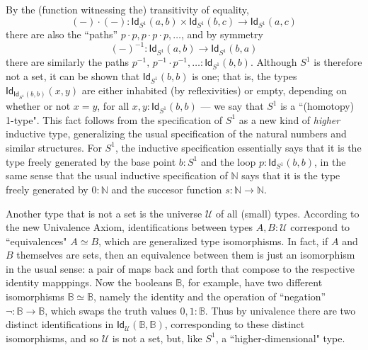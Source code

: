 \documentclass[11pt]{article}
\newcommand{\B}{\ensuremath{\mathbb{B}}}
\newcommand{\N}{\ensuremath{\mathbb{N}}}
\newcommand{\Id}{\mathsf{Id}}
\newcommand{\id}[1]{\Id_{#1}}
\newcommand{\U}{\ensuremath{\mathcal{U}}}
\theoremstyle{remark}
\theoremstyle{definition}
\begin{document}
%
%
By the (function witnessing the) transitivity of equality, 
\[
(-)\cdot(-) : \id{S^1}(a,b) \times \id{S^1}(b,c)\to \id{S^1}(a,c)
\]
 there are also the ``paths'' $p\cdot p, p\cdot p\cdot p, \ldots$, and by symmetry
 \[
 (-)^{-1}:\id{S^1}(a,b) \to \id{S^1}(b,a)
 \]
 there are similarly the paths $p^{-1},\, p^{-1}\cdot p^{-1}, \ldots :\id{S^1}(b,b)$.  Although $S^1$ is therefore not a set, it can be shown that $\id{S^1}(b,b)$ is one; that is, the types $\id{\id{S^1}(b,b)}(x,y)$ are either inhabited (by reflexivities) or empty, depending on whether or not $x=y$, for all $x,y : \id{S^1}(b,b)$ --- we say that $S^1$ is a ``(homotopy) 1-type".  This fact follows from the specification of $S^1$ as a new kind of \emph{higher} inductive type, generalizing the usual specification of the natural numbers and similar structures.  For $S^1$, the inductive specification essentially says that it is the type freely generated by the base point $b:S^1$ and the loop $p:\id{S^1}(b,b)$, in the same sense that the usual inductive specification of $\N$ says that it is the type freely generated by $0:\N$ and the succesor function $s:\N\to\N$.  
  
 Another type that is not a set is the universe $\U$ of all (small) types.  According to the new Univalence Axiom, identifications between types $A,B:\U$ correspond to ``equivalences" $A\simeq B$, which are generalized type isomorphisms.  In fact, if $A$ and $B$ themselves are sets, then an equivalence between them is just an isomorphism in the usual sense: a pair of maps back and forth that compose to the respective identity mapppings.  Now the booleans $\B$, for example, have two different isomorphisms $\B\simeq \B$, namely the identity and the operation of ``negation'' $\neg:\B\to\B$, which swaps the truth values $0,1:\B$.  Thus by univalence there are two distinct identifications in $\id{\U}(\B,\B)$, corresponding to these distinct isomorphisms, and so $\U$ is not a set, but, like $S^1$, a ``higher-dimensional" type.  
 
\end{document}
